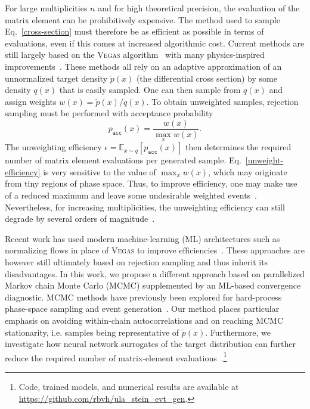 \documentclass{article}
\newcommand{\vegas}{\textsc{Vegas}}
\begin{document}
For large multiplicities $n$ and for high theoretical precision, the evaluation of the matrix element can be prohibitively expensive.
The method used to sample Eq.~\eqref{cross-section} must therefore be as efficient as possible in terms of evaluations, even if this comes at increased algorithmic cost.
Current methods are still largely based on the \vegas{} algorithm~\cite{Lepage:1977sw,Lepage:2020tgj} with many physics-inspired improvements~\cite{Kleiss:1994qy,Ohl:1998jn,Maltoni:2002qb,Krauss:2001iv,Papadopoulos:2000tt,Kilian:2007gr,Jadach:2002kn,Gleisberg:2008fv}.
These methods all rely on an adaptive approximation of an unnormalized target density $\widetilde{p}(x)$ (the differential cross section) by some density $q(x)$ that is easily sampled.
One can then sample from $q(x)$ and assign weights $w(x) = \widetilde{p}(x)/q(x)$.
To obtain unweighted samples, rejection sampling must be performed with acceptance probability
\begin{equation} \label{unweight-efficiency}
  p_{\texttt{acc}}(x) = \frac{w(x)}{\max_x w(x)}.
\end{equation}
The unweighting efficiency $\epsilon = \mathbb{E}_{x \sim q} \left[p_{\texttt{acc}}(x)\right]$ then determines the required number of matrix element evaluations per generated sample.
Eq.~\ref{unweight-efficiency} is very sensitive to the value of $\max_x w(x)$, which may originate from tiny regions of phase space.
Thus, to improve efficiency, one may make use of a reduced maximum and leave some undesirable weighted events~\cite{Sherpa:2024mfk}.
Nevertheless, for increasing multiplicities, the unweighting efficiency can still degrade by several orders of magnitude~\cite{Hoche:2019flt}.

Recent work has used modern machine-learning (ML) architectures such as normalizing flows in place of \vegas{} to improve efficiencies~\cite{Klimek:2018mza,Bothmann:2020ywa,Gao:2020zvv,Stienen:2020gns,Heimel:2022wyj,Verheyen:2022tov,Heimel:2023ngj,Heimel:2024wph}.
These approaches are however still ultimately based on rejection sampling and thus inherit its disadvantages.
In this work, we propose a different approach based on parallelized Markov chain Monte Carlo (MCMC) supplemented by an ML-based convergence diagnostic.
MCMC methods have previously been explored for hard-process phase-space sampling and event generation~\cite{Kharraziha:1999iw,Weinzierl:2001ny,Kroeninger:2014bwa,LaCagnina:2024wcc}.
Our method places particular emphasis on avoiding within-chain autocorrelations and on reaching MCMC stationarity, i.e. samples being representative of $\widetilde{p}(x)$.
Furthermore, we investigate how neural network surrogates of the target distribution can further reduce the required number of matrix-element evaluations~\cite{Danziger:2021eeg,Janssen:2023ahv,Herrmann:2025nnz}.\footnote{Code, trained models, and numerical results are available at \url{https://github.com/rbvh/ula_stein_evt_gen}.}
\end{document}
